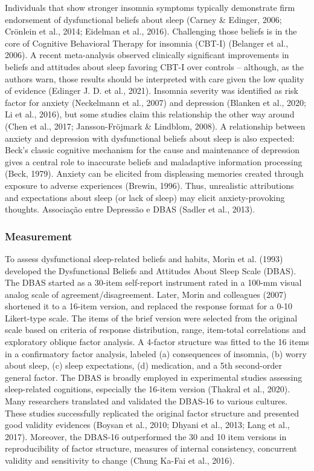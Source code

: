 \documentclass[
  ,doc,11pt, twoside,floatsintext]{apa6}
\begin{document}
Individuals that show stronger insomnia symptoms typically demonstrate firm endorsement of dysfunctional beliefs about sleep (Carney \& Edinger, 2006; Crönlein et al., 2014; Eidelman et al., 2016). Challenging those beliefs is in the core of Cognitive Behavioral Therapy for insomnia (CBT-I) (Belanger et al., 2006). A recent meta-analysis observed clinically significant improvements in beliefs and attitudes about sleep favoring CBT-I over controls -- although, as the authors warn, those results should be interpreted with care given the low quality of evidence (Edinger J. D. et al., 2021). Insomnia severity was identified as risk factor for anxiety (Neckelmann et al., 2007) and depression (Blanken et al., 2020; Li et al., 2016), but some studies claim this relationship the other way around (Chen et al., 2017; Jansson-Fröjmark \& Lindblom, 2008). A relationship between anxiety and depression with dysfunctional beliefs about sleep is also expected: Beck's classic cognitive mechanism for the cause and maintenance of depression gives a central role to inaccurate beliefs and maladaptive information processing (Beck, 1979). Anxiety can be elicited from displeasing memories created through exposure to adverse experiences (Brewin, 1996). Thus, unrealistic attributions and expectations about sleep (or lack of sleep) may elicit anxiety-provoking thoughts. Associação entre Depressão e DBAS (Sadler et al., 2013).

\hypertarget{measurement}{%
\subsubsection{Measurement}\label{measurement}}

To assess dysfunctional sleep-related beliefs and habits, Morin et al. (1993) developed the Dysfunctional Beliefs and Attitudes About Sleep Scale (DBAS). The DBAS started as a 30-item self-report instrument rated in a 100-mm visual analog scale of agreement/disagreement. Later, Morin and colleagues (2007) shortened it to a 16-item version, and replaced the response format for a 0-10 Likert-type scale. The items of the brief version were selected from the original scale based on criteria of response distribution, range, item-total correlations and exploratory oblique factor analysis. A 4-factor structure was fitted to the 16 items in a confirmatory factor analysis, labeled (a) consequences of insomnia, (b) worry about sleep, (c) sleep expectations, (d) medication, and a 5th second-order general factor. The DBAS is broadly employed in experimental studies assessing sleep-related cognitions, especially the 16-item version (Thakral et al., 2020). Many researchers translated and validated the DBAS-16 to various cultures. These studies successfully replicated the original factor structure and presented good validity evidences (Boysan et al., 2010; Dhyani et al., 2013; Lang et al., 2017). Moreover, the DBAS-16 outperformed the 30 and 10 item versions in reproducibility of factor structure, measures of internal consistency, concurrent validity and sensitivity to change (Chung Ka-Fai et al., 2016).
\end{document}

